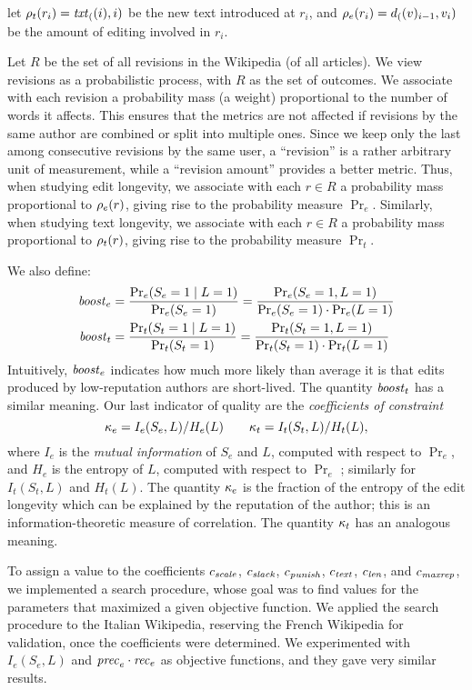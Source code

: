 let $\rho_t(r_i) = \mathit{txt}_{(}(i),i)$ be the new text introduced at $r_i$, 
and $\rho_e(r_i) = d_{(}(v)_{i-1},v_i)$ be the amount of editing
involved in $r_i$. 
%

Let $R$ be the set of all revisions in the Wikipedia (of all articles). 
We view revisions as a probabilistic process, with $R$ as the set of
outcomes.
We associate with each revision a probability mass (a weight)
proportional to the number of words it affects. 
This ensures that the metrics are not affected if revisions by the
same author are combined or split into multiple ones. 
Since we keep only the last among consecutive revisions by the same
user, a ``revision'' is a rather arbitrary unit of measurement, while
a ``revision amount'' provides a better metric. 
Thus, when studying edit longevity, we associate with each $r \in R$ a
probability mass proportional to $\rho_e(r)$, giving rise to the
probability measure $\Pr_e$. 
Similarly, when studying text longevity, we associate with each 
$r \in R$ a probability mass proportional to $\rho_t(r)$, giving
rise to the probability measure $\Pr_t$. 

We also define: 
%
\begin{align*}
  {\text{\textit{boost}}}_e & = \frac{\Pr_e(S_e=1 \mid L=1)}{\Pr_e(S_e=1)}
            = \frac{\Pr_e(S_e=1 , L=1)}{\Pr_e(S_e=1)\cdot\Pr_e(L=1)} \\
  {\text{\textit{boost}}}_t & = \frac{\Pr_t(S_t=1 \mid L=1)}{\Pr_t(S_t=1)}
            = \frac{\Pr_t(S_t=1 , L=1)}{\Pr_t(S_t=1)\cdot\Pr_t(L=1)}
\end{align*}
%
Intuitively, ${\text{\textit{boost}}}_e$ indicates how much more likely than average
it is that edits produced by low-reputation authors are short-lived.
The quantity ${\text{\textit{boost}}}_t$ has a similar meaning. 
Our last indicator of quality are the {\em coefficients of constraint\/}
\[ 
  \kappa_e = I_e(S_e,L) / H_e(L)
  \qquad 
  \kappa_t = I_t(S_t,L) / H_t(L),
\]
where $I_e$ is the {\em mutual information\/} of $S_e$ and $L$,
computed with respect to $\Pr_e$, and $H_e$ is the entropy of $L$,
computed with respect to $\Pr_e$ \cite{CoverBook}; similarly for
$I_t(S_t,L)$ and $H_t(L)$.
The quantity $\kappa_e$ is the fraction of the entropy of the
edit longevity which can be explained by the reputation of the author; 
this is an information-theoretic measure of correlation. 
The quantity $\kappa_t$ has an analogous meaning. 

To assign a value to the coefficients ${c_{{\text{\textit{scale}}}}}$, ${c_{{\text{\textit{slack}}}}}$,
${c_{{\text{\textit{punish}}}}}$, ${c_{{\text{\textit{text}}}}}$, ${c_{{\text{\textit{len}}}}}$, and ${c_{{\text{\textit{maxrep}}}}}$, 
we implemented a search procedure, whose goal was to find values for
the parameters that maximized a given objective function. 
We applied the search procedure to the Italian Wikipedia, reserving
the French Wikipedia for validation, once the coefficients were
determined. 
We experimented with $I_e(S_e,L)$ and ${\text{\textit{prec}}}_e \cdot {\text{\textit{rec}}}_e$
as objective functions, and they gave very similar results. 
